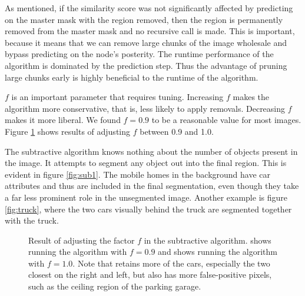 \documentclass[10pt,twocolumn,letterpaper]{article}
\begin{document}
As mentioned, if the similarity score was not significantly affected by
predicting on the master mask with the region removed, then the region is
permanently removed from the master mask
and no recursive call is made.  This is important, because it means
that we can remove large chunks of the image wholesale and bypass predicting
on the node's posterity.
The runtime performance of the algorithm is dominated by the prediction step.
Thus the advantage of pruning large chunks early is highly beneficial to
the runtime of the algorithm.

$f$ is an important parameter that requires tuning.  Increasing $f$ makes the
algorithm more conservative, that is, less likely to apply removals.  Decreasing
$f$ makes it more liberal.  We found $f=0.9$ to be a reasonable value for most images.
Figure \ref{fig:f} shows results of adjusting $f$ between 0.9 and 1.0.

The subtractive algorithm knows nothing about the number of objects present
in the image.  It attempts to segment any object out into the final region.
This is evident in figure \ref{fig:sub1}.  The mobile homes in the background
have car attributes and thus are included in the final segmentation, even
though they take a far less prominent role in the unsegmented image.  Another
example is figure \ref{fig:truck}, where the two cars visually behind the truck
are segmented together with the truck.

\begin{figure}
\centering
{}
 \caption{Result of adjusting the factor $f$ in the subtractive
algorithm.  shows running the algorithm with $f=0.9$
and  shows running the algorithm with $f=1.0$.  Note
that  retains more of the cars, especially the two
closest on the right and left, but also has more false-positive
pixels, such as the ceiling region of the parking garage.}
\label{fig:f}
\end{figure}
\end{document}
